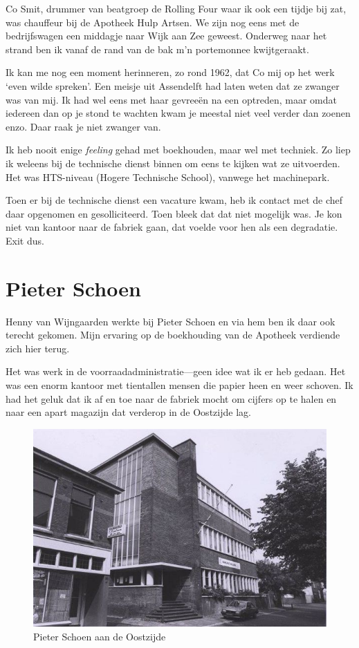 \documentclass[12pt,twoside, openright]{memoir}
\begin{document}
Co Smit, drummer van beatgroep de Rolling Four waar ik ook een tijdje bij zat, was chauffeur bij de Apotheek Hulp Artsen. We zijn nog eens met de bedrijfswagen een middagje naar Wijk aan Zee geweest. Onderweg naar het strand ben ik vanaf de rand van de bak m’n portemonnee kwijtgeraakt.

Ik kan me nog een moment herinneren, zo rond 1962, dat Co mij op het werk `even wilde spreken'. Een meisje uit Assendelft had laten weten dat ze zwanger was van mij. Ik had wel eens met haar gevreeën na een optreden, maar omdat iedereen dan op je stond te wachten kwam je meestal niet veel verder dan zoenen enzo. Daar raak je niet zwanger van. 

Ik heb nooit enige \emph{feeling} gehad met boekhouden, maar wel met techniek. Zo liep ik weleens bij de technische dienst binnen om eens te kijken wat ze uitvoerden. Het was HTS-niveau (Hogere Technische School), vanwege het machinepark. 

Toen er bij de technische dienst een vacature kwam, heb ik contact met de chef daar opgenomen en gesolliciteerd. Toen bleek dat dat niet mogelijk was. Je kon niet van kantoor naar de fabriek gaan, dat voelde voor hen als een degradatie. Exit dus.

\section*{Pieter Schoen} %
\label{cha:schoen}

Henny van Wijngaarden werkte bij Pieter Schoen en via hem ben ik daar ook terecht gekomen. Mijn ervaring op de boekhouding van de Apotheek verdiende zich hier terug.

Het was werk in de voorraadadministratie---geen idee wat ik er heb gedaan. Het was een enorm kantoor met tientallen mensen die papier heen en weer schoven. Ik had het geluk dat ik af en toe naar de fabriek mocht om cijfers op te halen en naar een apart magazijn dat verderop in de Oostzijde lag. 

\begin{figure}
\centering
\includegraphics[width=\textwidth]{img/212pieterschoen}
\caption*{\footnotesize Pieter Schoen aan de Oostzijde}
\end{figure}
\end{document}
